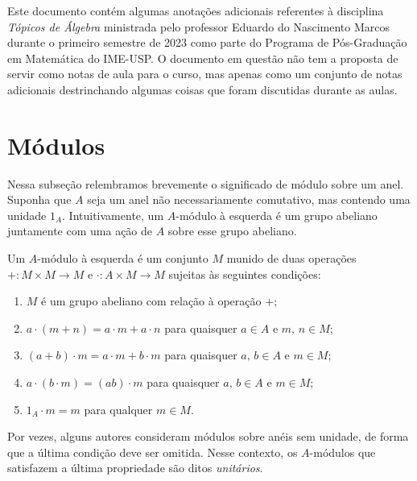 



\maketitle

Este documento contém algumas anotações adicionais referentes à
disciplina \emph{Tópicos de Álgebra} ministrada pelo professor Eduardo
do Nascimento Marcos durante o primeiro semestre de 2023 como parte do
Programa de Pós-Graduação em Matemática do IME-USP.  O documento em
questão não tem a proposta de servir como notas de aula para o curso,
mas apenas como um conjunto de notas adicionais destrinchando algumas
coisas que foram discutidas durante as aulas.

\section{Módulos}

Nessa subseção relembramos brevemente o significado de módulo sobre um anel.
Suponha que $A$ seja um anel não necessariamente comutativo, mas contendo uma unidade $1_A$.
Intuitivamente, um $A$-módulo à esquerda é um grupo abeliano juntamente com uma ação de $A$ sobre esse grupo abeliano.

\begin{defin}
  Um $A$-módulo à esquerda é um conjunto $M$ munido de duas operações $+: M \times M \to M$ e $\cdot: A \times M \to M$ sujeitas às seguintes condições:
  \begin{enumerate}
  \item $M$ é um grupo abeliano com relação à operação $+$;
    
  \item $a \cdot (m+n) = a \cdot m + a \cdot n$ para quaisquer $a  \in A$ e $m,\, n \in M$;
    
  \item $(a+b) \cdot m = a \cdot m + b \cdot m$ para quaisquer $a,\, b \in A$ e $m \in M$;
    
  \item $a \cdot (b \cdot m) = (ab) \cdot m$ para quaisquer $a,\, b \in A$ e $m \in M$;
    
  \item $1_A \cdot m = m$ para qualquer $m \in M$.
  \end{enumerate}
\end{defin}

Por vezes, alguns autores consideram módulos sobre anéis sem unidade, de forma que a última condição deve ser omitida.
Nesse contexto, os $A$-módulos que satisfazem a última propriedade são ditos \emph{unitários}.

